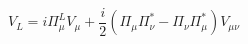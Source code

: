 \begin{equation} 
V_{L} = i \Pi_{\mu}^{L} V_{\mu} + \frac{i}{2}  
(\Pi_{\mu} \Pi_{\nu}^{*} - \Pi_{\nu} \Pi_{\mu}^{*}) V_{\mu \nu}  
\label{eq:vl} 
\end{equation} 
